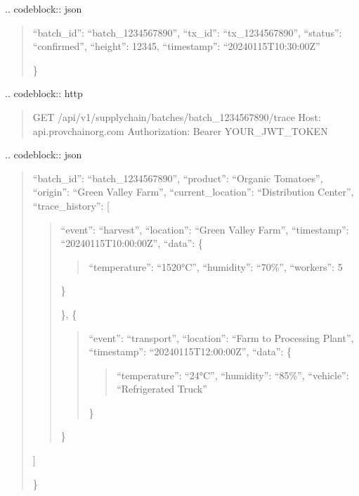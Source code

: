 \documentclass[letterpaper,10pt,english]{sphinxmanual}
\begin{document}
\sphinxAtStartPar
{}
.. code\sphinxhyphen{}block:: json
\begin{quote}
\begin{description}
\sphinxlineitem{\{}
\sphinxAtStartPar
“batch\_id”: “batch\_1234567890”,
“tx\_id”: “tx\_1234567890”,
“status”: “confirmed”,
“height”: 12345,
“timestamp”: “2024\sphinxhyphen{}01\sphinxhyphen{}15T10:30:00Z”

\end{description}

\sphinxAtStartPar
\}
\end{quote}

\sphinxAtStartPar
{}
.. code\sphinxhyphen{}block:: http
\begin{quote}

\sphinxAtStartPar
GET /api/v1/supply\sphinxhyphen{}chain/batches/batch\_1234567890/trace
Host: api.provchain\sphinxhyphen{}org.com
Authorization: Bearer YOUR\_JWT\_TOKEN
\end{quote}

\sphinxAtStartPar
{}
.. code\sphinxhyphen{}block:: json
\begin{quote}
\begin{description}
\sphinxlineitem{\{}
\sphinxAtStartPar
“batch\_id”: “batch\_1234567890”,
“product”: “Organic Tomatoes”,
“origin”: “Green Valley Farm”,
“current\_location”: “Distribution Center”,
“trace\_history”: {[}
\begin{quote}
\begin{description}
\sphinxlineitem{\{}
\sphinxAtStartPar
“event”: “harvest”,
“location”: “Green Valley Farm”,
“timestamp”: “2024\sphinxhyphen{}01\sphinxhyphen{}15T10:00:00Z”,
“data”: \{
\begin{quote}

\sphinxAtStartPar
“temperature”: “15\sphinxhyphen{}20°C”,
“humidity”: “70\%”,
“workers”: 5
\end{quote}

\sphinxAtStartPar
\}

\end{description}

\sphinxAtStartPar
\},
\{
\begin{quote}

\sphinxAtStartPar
“event”: “transport”,
“location”: “Farm to Processing Plant”,
“timestamp”: “2024\sphinxhyphen{}01\sphinxhyphen{}15T12:00:00Z”,
“data”: \{
\begin{quote}

\sphinxAtStartPar
“temperature”: “2\sphinxhyphen{}4°C”,
“humidity”: “85\%”,
“vehicle”: “Refrigerated Truck”
\end{quote}

\sphinxAtStartPar
\}
\end{quote}

\sphinxAtStartPar
\}
\end{quote}

\sphinxAtStartPar
{]}

\end{description}

\sphinxAtStartPar
\}
\end{quote}
\end{document}
